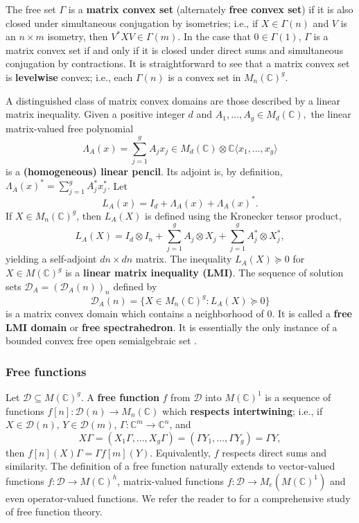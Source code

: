\documentclass[11pt,makeidx]{amsart}
\renewcommand{\subset}{\subseteq}
\def\cD{\mathcal D}
\def\beq{\begin{equation}}
\def\eeq{\end{equation}}
\def\C{ {\mathbb{C}} }
\newcommand{\df}[1]{{\bf{#1}}{\index{#1}}}
\newcommand{\La}{\Lambda}
\def\bCx{\mathbb C\langle x_1,\dots,x_g\rangle}
\def\matg{M(\mathbb C)^g}
\begin{document}
  The free set $\Gamma$ is a \df{matrix convex set} (alternately \df{free convex set}) if it is also closed under simultaneous conjugation by isometries; i.e., if $X\in \Gamma(n)$ and $V$ is an $n\times m$ isometry, then  $V^* XV \in \Gamma(m)$.  In the case that $0\in \Gamma(1)$, $\Gamma$ is a matrix convex set if and only if it is closed under direct sums and simultaneous conjugation by contractions.  It is straightforward to see that a matrix convex set is \df{levelwise} convex; i.e., each $\Gamma(n)$ is a convex set in $M_n(\mathbb C)^g$.

  A distinguished class of matrix convex domains
  are those described by a linear matrix inequality. 
  Given a positive integer $d$
  and  $A_1,\dots,A_g \in M_d(\C),$ the
  linear matrix-valued free polynomial
\beq\label{eq:linPenc}
  \La_A(x)=\sum_{j=1}^g A_j x_j\in M_d(\C)\otimes \bCx
\eeq
  is a {\bf (homogeneous) linear pencil}. 
  Its adjoint is, by definition,
$
  \La_A(x)^*=\sum_{j=1}^g A_j^* x_j^*.
$
  Let 
\beq\label{eq:linPencMonic}
  L_A(x) = I_d + \La_A(x) +\La_A(x)^*.
\eeq
  If $X\in M_n(\C)^g$, then $L_A(X)$ is defined using the Kronecker tensor product,
\[
  L_A(X) = I_d\otimes I_n
          +\sum_{j=1}^g A_j\otimes X_j +\sum_{j=1}^g A_j^* \otimes X_j^*,
\]
 yielding a self-adjoint $dn\times dn$ matrix.
  The inequality $L_A(X)\succeq 0$  for   $X\in\matg$
  is a {\bf linear matrix inequality (LMI)}. 
   The sequence of solution sets
 $\cD_{A}=(\cD_A(n))_n$ defined by
\beq\label{eq:LMI}
 \cD_{A}(n) = \{X\in M_n(\C)^g : L_A(X)\succeq 0\}
\eeq
 is a matrix convex domain which contains a neighborhood
 of $0$. It is called a {\bf free LMI domain} or 
 {\bf free spectrahedron}.
 It is essentially the {only instance of 
a bounded  convex free open semialgebraic set} \cite{HM12}.

\subsubsection{Free functions}
Let $\cD\subset M(\C)^g$.
 A {\bf free  function}   $f$ from $\cD$ into $M(\C)^1$ is a sequence
 of functions $f[n]:\cD(n) \to M_n(\C)$ which
  {\bf respects intertwining}; i.e.,
 if $X\in\cD(n)$, $Y\in\cD(m)$, $\Gamma:\mathbb C^m\to\mathbb C^n$,
  and
 \[
  X\Gamma=(X_1\Gamma,\dots, X_g\Gamma)
   =(\Gamma Y_1,\dots, \Gamma Y_g)=\Gamma Y,
 \]
  then $f[n](X) \Gamma =  \Gamma f[m] (Y)$.
  Equivalently, $f$ respects direct sums and similarity.
The definition of a free  function naturally extends to
vector-valued functions $f:\cD\to M(\C)^h$,
matrix-valued functions $f:\cD\to M_e(M(\C)^1)$ and even
 operator-valued functions. We refer the reader to
 \cite{KVV14,Voi10} for a comprehensive study of free function theory.
\end{document}
